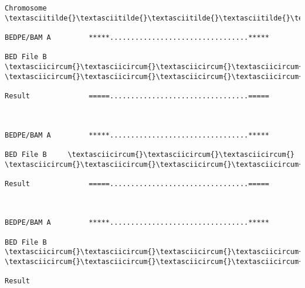 \documentclass[letterpaper,10pt,english]{sphinxmanual}
\begin{document}
\begin{Verbatim}[commandchars=\\\{\}]
Chromosome  \textasciitilde{}\textasciitilde{}\textasciitilde{}\textasciitilde{}\textasciitilde{}\textasciitilde{}\textasciitilde{}\textasciitilde{}\textasciitilde{}\textasciitilde{}\textasciitilde{}\textasciitilde{}\textasciitilde{}\textasciitilde{}\textasciitilde{}\textasciitilde{}\textasciitilde{}\textasciitilde{}\textasciitilde{}\textasciitilde{}\textasciitilde{}\textasciitilde{}\textasciitilde{}\textasciitilde{}\textasciitilde{}\textasciitilde{}\textasciitilde{}\textasciitilde{}\textasciitilde{}\textasciitilde{}\textasciitilde{}\textasciitilde{}\textasciitilde{}\textasciitilde{}\textasciitilde{}\textasciitilde{}\textasciitilde{}\textasciitilde{}\textasciitilde{}\textasciitilde{}\textasciitilde{}\textasciitilde{}\textasciitilde{}\textasciitilde{}\textasciitilde{}\textasciitilde{}\textasciitilde{}\textasciitilde{}\textasciitilde{}\textasciitilde{}\textasciitilde{}\textasciitilde{}\textasciitilde{}\textasciitilde{}\textasciitilde{}\textasciitilde{}\textasciitilde{}\textasciitilde{}\textasciitilde{}\textasciitilde{}\textasciitilde{}\textasciitilde{}\textasciitilde{}\textasciitilde{}

BEDPE/BAM A         *****.................................*****

BED File B         \textasciicircum{}\textasciicircum{}\textasciicircum{}\textasciicircum{}\textasciicircum{}\textasciicircum{}\textasciicircum{}\textasciicircum{}                                          \textasciicircum{}\textasciicircum{}\textasciicircum{}\textasciicircum{}\textasciicircum{}\textasciicircum{}

Result              =====.................................=====



BEDPE/BAM A         *****.................................*****

BED File B     \textasciicircum{}\textasciicircum{}\textasciicircum{}                                               \textasciicircum{}\textasciicircum{}\textasciicircum{}\textasciicircum{}\textasciicircum{}\textasciicircum{}

Result              =====.................................=====



BEDPE/BAM A         *****.................................*****

BED File B         \textasciicircum{}\textasciicircum{}\textasciicircum{}\textasciicircum{}                                   \textasciicircum{}\textasciicircum{}\textasciicircum{}\textasciicircum{}\textasciicircum{}\textasciicircum{}

Result
\end{Verbatim}
\end{document}

